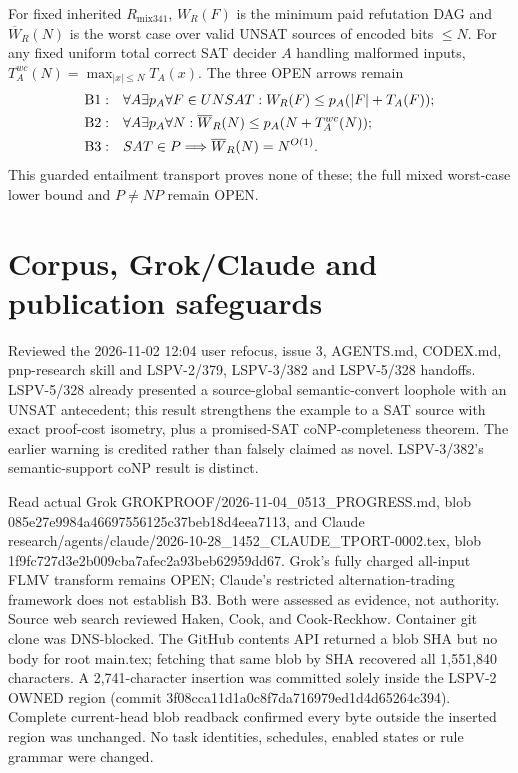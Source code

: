 \documentclass[11pt]{article}
\begin{document}
For fixed inherited $R_{\mathrm{mix341}}$, $W_R(F)$ is the minimum paid refutation DAG and $\overline W_R(N)$ is the worst case over valid UNSAT sources of encoded bits $\le N$. For any fixed uniform total correct SAT decider $A$ handling malformed inputs, $T_A^{wc}(N)=\max_{|x|\le N}T_A(x)$. The three OPEN arrows remain
\[
\begin{aligned}
{\rm B1}:&\quad\forall A\exists p_A\forall F\in UNSAT:
W_R(F)\le p_A(|F|+T_A(F));\\
{\rm B2}:&\quad\forall A\exists p_A\forall N:
\overline W_R(N)\le p_A(N+T_A^{wc}(N));\\
{\rm B3}:&\quad SAT\in P\Longrightarrow\overline W_R(N)=N^{O(1)}.
\end{aligned}
\]
This guarded entailment transport proves none of these; the full mixed worst-case lower bound and $P\ne NP$ remain OPEN.

\section*{Corpus, Grok/Claude and publication safeguards}
Reviewed the 2026-11-02 12:04 user refocus, issue 3, AGENTS.md, CODEX.md, pnp-research skill and LSPV-2/379, LSPV-3/382 and LSPV-5/328 handoffs. LSPV-5/328 already presented a source-global semantic-convert loophole with an UNSAT antecedent; this result strengthens the example to a SAT source with exact proof-cost isometry, plus a promised-SAT coNP-completeness theorem. The earlier warning is credited rather than falsely claimed as novel. LSPV-3/382's semantic-support coNP result is distinct.

Read actual Grok GROKPROOF/2026-11-04\_0513\_PROGRESS.md, blob 085e27e9984a46697556125c37beb18d4eea7113, and Claude research/agents/claude/2026-10-28\_1452\_CLAUDE\_TPORT-0002.tex, blob 1f9fc727d3e2b009cba7afec2a93beb62959dd67. Grok's fully charged all-input FLMV transform remains OPEN; Claude's restricted alternation-trading framework does not establish B3. Both were assessed as evidence, not authority. Source web search reviewed Haken, Cook, and Cook-Reckhow. Container git clone was DNS-blocked. The GitHub contents API returned a blob SHA but no body for root main.tex; fetching that same blob by SHA recovered all 1,551,840 characters. A 2,741-character insertion was committed solely inside the LSPV-2 OWNED region (commit 3f08cca11d1a0c8f7da716979ed1d4d65264c394). Complete current-head blob readback confirmed every byte outside the inserted region was unchanged. No task identities, schedules, enabled states or rule grammar were changed.
\end{document}
